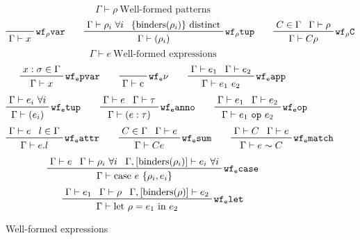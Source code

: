 \documentclass[letterpaper]{article}
\begin{document}
\begin{figure}
  $$ \boxed{\Gamma\vdash \rho}\ \textrm{Well-formed patterns} $$
  $$ \prfbyaxiom{$\mathtt{wf_\rho var}$}
             {\Gamma\vdash x}\qquad
     \prftree[r]{$\mathtt{wf_\rho tup}$}
             {\prfassumption{\Gamma\vdash\rho_i\ \forall i}}
             {\prfassumption{\{\mathrm{binders}(\rho_i)\}\textrm{ distinct}}}
             {\Gamma\vdash (\rho_i)}\qquad
     \prftree[r]{$\mathtt{wf_\rho C}$}
             {\prfassumption{C\in\Gamma}}{\prfassumption{\Gamma\vdash\rho}}
             {\Gamma\vdash C\rho} $$
  $$ \boxed{\Gamma\vdash e}\ \textrm{Well-formed expressions} $$
  $$ \prftree[r]{$\mathtt{wf_e pvar}$}
             {\prfassumption{x:\sigma\in\Gamma}}
             {\Gamma\vdash x}\qquad
     \prfbyaxiom{$\mathtt{wf_e \nu}$}
             {\Gamma\vdash \textrm{c}}\qquad
     \prftree[r]{$\mathtt{wf_e app}$}
             {\prfassumption{\Gamma\vdash e_1}}{\prfassumption{\Gamma\vdash e_2}}
             {\Gamma\vdash e_1\ e_2} $$
  $$ \prftree[r]{$\mathtt{wf_e tup}$}
             {\prfassumption{\Gamma\vdash e_i\ \forall i}}
             {\Gamma\vdash (e_i)}\qquad
     \prftree[r]{$\mathtt{wf_e anno}$}
             {\prfassumption{\Gamma\vdash e}}{\prfassumption{\Gamma\vdash\tau}}
             {\Gamma\vdash (e : \tau)}\qquad
     \prftree[r]{$\mathtt{wf_e op}$}
             {\prfassumption{\Gamma\vdash e_1}}{\prfassumption{\Gamma\vdash e_2}}
             {\Gamma\vdash e_1\ \texttt{op}\ e_2} $$
  $$ \prftree[r]{$\mathtt{wf_e attr}$}
             {\prfassumption{\Gamma\vdash e}}{\prfassumption{l\in\Gamma}}
             {\Gamma\vdash e.l}\qquad
     \prftree[r]{$\mathtt{wf_e sum}$}
             {\prfassumption{C\in\Gamma}}{\prfassumption{\Gamma\vdash e}}
             {\Gamma\vdash C e}\qquad
     \prftree[r]{$\mathtt{wf_e match}$}
             {\prfassumption{\Gamma\vdash C}}{\prfassumption{\Gamma\vdash e}}
             {\Gamma\vdash e \sim C} $$
  $$ \prftree[r]{$\mathtt{wf_e case}$}
             {\prfassumption{\Gamma\vdash e}}{\prfassumption{\Gamma\vdash\rho_i\ \forall i}}
             {\prfassumption{\Gamma,[\mathrm{binders}(\rho_i)]\vdash e_i\ \forall i}}
             {\Gamma\vdash\textrm{case}\ e\ \{\rho_i, e_i\}} $$
  $$ \prftree[r]{$\mathtt{wf_e let}$}
             {\prfassumption{\Gamma\vdash e_1}}{\prfassumption{\Gamma\vdash\rho}}
             {\prfassumption{\Gamma,[\mathrm{binders}(\rho)]\vdash e_2}}
             {\Gamma\vdash\textrm{let}\ \rho=e_1\ \textrm{in}\ e_2} $$
  \caption{Well-formed expressions}
  \label{f:wf:expressions}
\end{figure}
\end{document}
